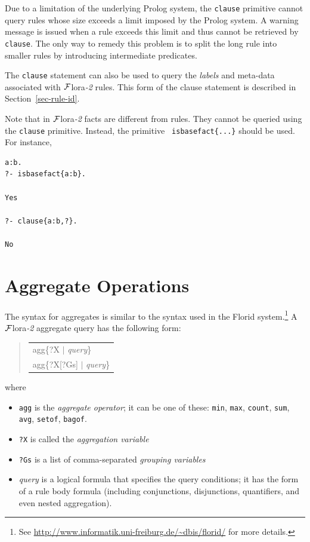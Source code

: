 \documentclass[11pt]{article}
\newcommand{\FLORA}{{\mbox{\sc ${\cal F}${lora}\rm\emph{-2}}}\xspace}
\newcommand{\FLSYSTEM}{\FLORA}
\newenvironment{qrules}{\begin{quote}\tt\begin{tabular}[t]{l}}%
{\end{tabular}\end{quote}}
\newcommand{\FLORID}{{\mbox{\sc Florid}}\xspace}
\begin{document}
Due to a limitation of the underlying Prolog system, the {\tt clause}
primitive cannot query rules whose size exceeds a limit imposed by the
Prolog system.  A warning message is issued when a rule exceeds this limit
and thus cannot be retrieved by {\tt clause}.  The only way to remedy this
problem is to split the long rule into smaller rules by introducing
intermediate predicates.

The {\tt clause} statement can also be used to query the \emph{labels} and
meta-data associated with \FLSYSTEM rules. This form of the clause statement
is described in Section~\ref{sec-rule-id}.

Note that in \FLSYSTEM facts are different from rules. They cannot be queried
using the {\tt clause} primitive. Instead, the primitive {\tt
  isbasefact\{...\}} should be used. For instance,
\begin{verbatim}
a:b.
?- isbasefact{a:b}.

Yes

?- clause{a:b,?}.

No
\end{verbatim}


\ifdef{\isfloraman}{}
{
    
}



\section{Aggregate Operations}
\label{sec-aggregates}


The syntax for aggregates is similar to the syntax used in the \FLORID
system.\footnote{
  See \url{http://www.informatik.uni-freiburg.de/~dbis/florid/} for more
  details.
}
A \FLSYSTEM aggregate query has the following form:
\begin{qrules}
agg\{?X $|$ {\it query}\}\\
agg\{?X[?Gs] $|$ {\it query}\}
\end{qrules}
%
where
\begin{itemize}
\item  {\tt agg} is the \emph{aggregate operator};  it can be one of these:
  \texttt{min},
  \texttt{max}, \texttt{count}, \texttt{sum}, \texttt{avg}, \texttt{setof},
  \texttt{bagof}.
\item {\tt ?X} is called the \emph{aggregation variable}
\item {\tt ?Gs} is a list of comma-separated \emph{grouping variables}  
\item {\it query} is a logical formula that specifies the
  query conditions; it has the form of a rule body formula (including
  conjunctions, disjunctions, quantifiers, and even nested aggregation).
\end{itemize}
\end{document}
